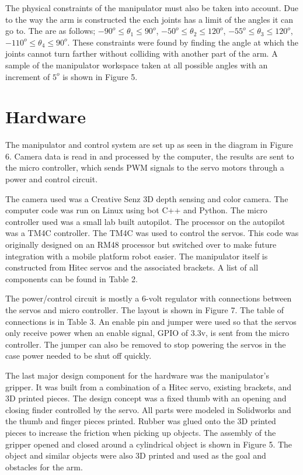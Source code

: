 \documentclass[letterpaper,12pt]{report}
\begin{document}
The physical constraints of the manipulator must also be taken into account. Due to the way the arm is constructed the each joints has a limit of the angles it can go to. The are as follows; $-90^o \leq \theta_1 \leq 90^o$, $-50^o \leq \theta_2 \leq 120^o$, $-55^o \leq \theta_3 \leq 120^o$, $-110^o \leq \theta_4 \leq 90^o$. These constraints were found by finding the angle at which the joints cannot turn farther without colliding with another part of the arm. A sample of the manipulator workspace taken at all possible angles with an increment of $5^o$ is shown in Figure 5.  

\chapter{Hardware}
The manipulator and control system are set up as seen in the diagram in Figure 6. Camera data is read in and processed by the computer, the results are sent to the micro controller, which sends PWM signals to the servo motors through a power and control circuit. 

The camera used was a Creative Senz 3D depth sensing and color camera. The computer code was run on Linux using bot C++ and Python. The micro controller used was a small lab built autopilot. The processor on the autopilot was a TM4C controller. The TM4C was used to control the servos. This code was originally designed on an RM48 processor but switched over to make future integration with a mobile platform robot easier. The manipulator itself is constructed from Hitec servos and the associated brackets. A list of all components can be found in Table 2.

The power/control circuit is mostly a 6-volt regulator with connections between the servos and micro controller. The layout is shown in Figure 7. The table of connections is in Table 3. An enable pin and jumper were used so that the servos only receive power when an enable signal, GPIO of 3.3v, is sent from the micro controller. The jumper can also be removed to stop powering the servos in the case power needed to be shut off quickly.

The last major design component for the hardware was the manipulator's gripper. It was built from a combination of a Hitec servo, existing brackets, and 3D printed pieces. The design concept was a fixed thumb with an opening and closing finder controlled by the servo. All parts were modeled in Solidworks and the thumb and finger pieces printed. Rubber was glued onto the 3D printed pieces to increase the friction when picking up objects. The assembly of the gripper opened and closed around a cylindrical object is shown in Figure 5. The object and similar objects were also 3D printed and used as the goal and obstacles for the arm.
\end{document}
